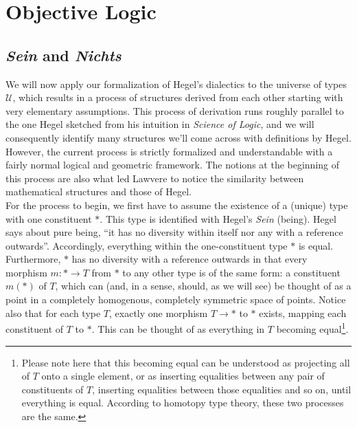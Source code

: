 \documentclass{article}
\begin{document}
\section{Objective Logic}
\subsection{\emph{Sein} and \emph{Nichts}}
We will now apply our formalization of Hegel's dialectics to the universe of types $\mathcal{U}$, which results in a process of structures derived from each other starting with very elementary assumptions. This process of derivation runs roughly parallel to the one Hegel sketched from his intuition in \emph{Science of Logic}, and we will consequently identify many structures we'll come across with definitions by Hegel. However, the current process is strictly formalized and understandable with a fairly normal logical and geometric framework. The notions at the beginning of this process are also what led Lawvere to notice the similarity between mathematical structures and those of Hegel. \\

For the process to begin, we first have to assume the existence of a (unique) type with one constituent $*$. This type is identified with Hegel's \emph{Sein} (being). Hegel says about pure being, ``it has no diversity within itself nor any with a reference outwards''. Accordingly, everything within the one-constituent type $*$ is equal. Furthermore, $*$ has no diversity with a reference outwards in that every morphism $m:*\rightarrow T$ from $*$ to any other type is of the same form: a constituent $m(*)$ of $T$, which can (and, in a sense, should, as we will see) be thought of as a point in a completely homogenous, completely symmetric space of points. Notice also that for each type $T$, exactly one morphism $T\rightarrow *$ to $*$ exists, mapping each constituent of $T$ to $*$. This can be thought of as everything in $T$ becoming equal\footnote{Please note here that this becoming equal can be understood as projecting all of $T$ onto a single element, or as inserting equalities between any pair of constituents of $T$, inserting equalities between those equalities and so on, until everything is equal. According to homotopy type theory, these two processes are the same.}. \\ 
\end{document}
